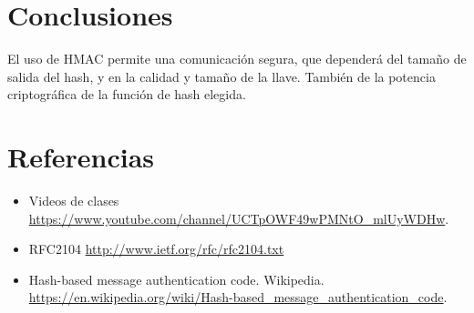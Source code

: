 \documentclass[letter, 10pt]{article}
\begin{document}
\section{Conclusiones}
El uso de HMAC permite una comunicación segura, que dependerá del tamaño de salida del hash, y en la calidad
y tamaño de la llave. También de la potencia criptográfica de la función de hash elegida.


\section{Referencias}
\begin{itemize}
 \item Videos de clases \url{https://www.youtube.com/channel/UCTpOWF49wPMNtO_mlUyWDHw}.
 \item RFC2104 \url{http://www.ietf.org/rfc/rfc2104.txt}
 \item Hash-based message authentication code. Wikipedia. \url{https://en.wikipedia.org/wiki/Hash-based_message_authentication_code}.
\end{itemize}
\end{document}
